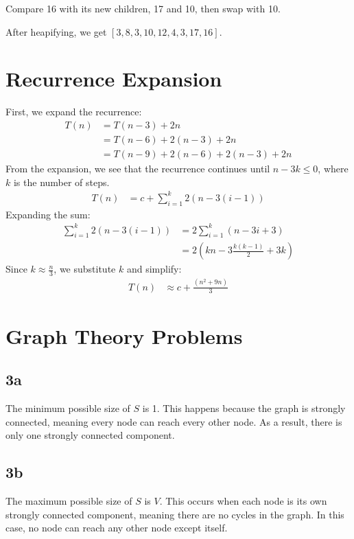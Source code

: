 \documentclass{article}
\begin{document}
Compare 16 with its new children, 17 and 10, then swap with 10.  

After heapifying, we get \([3, 8, 3, 10, 12, 4, 3, 17, 16]\).

\pagebreak

\section*{Recurrence Expansion}
First, we expand the recurrence:
\begin{align*}
T(n) &= T(n - 3) + 2n \\
&= T(n - 6) + 2(n - 3) + 2n \\
&= T(n - 9) + 2(n - 6) + 2(n - 3) + 2n
\end{align*}
From the expansion, we see that the recurrence continues until \( n - 3k \leq 0 \), where \( k \) is the number of steps.
\begin{align*}
T(n) &= c + \sum_{i=1}^{k} 2(n - 3(i - 1))
\end{align*}
Expanding the sum:
\begin{align*}
\sum_{i=1}^{k} 2(n - 3(i - 1)) &= 2 \sum_{i=1}^{k} (n - 3i + 3) \\
&= 2\left(kn - 3 \frac{k(k - 1)}{2} + 3k \right)
\end{align*}
Since \( k \approx \frac{n}{3} \), we substitute \( k \) and simplify:
\begin{align*}
T(n) &\approx c + \frac{(n^2 + 9n)}{3}
\end{align*}

\pagebreak

\section*{Graph Theory Problems}

\subsection*{3a}
The minimum possible size of \( S \) is 1. This happens because the graph is strongly connected, meaning every node can reach every other node. As a result, there is only one strongly connected component.

\subsection*{3b}
The maximum possible size of \( S \) is \( V \). This occurs when each node is its own strongly connected component, meaning there are no cycles in the graph. In this case, no node can reach any other node except itself.
\end{document}
